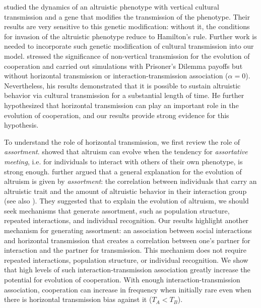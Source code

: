 \documentclass[12pt]{extarticle}
\begin{document}
\citet{feldman1985gene} studied the dynamics of an altruistic phenotype with vertical cultural transmission and a gene that modifies the transmission of the phenotype. Their results are very sensitive to this genetic modification: without it, the conditions for invasion of the altruistic phenotype reduce to Hamilton's rule.
Further work is needed to incorporate such genetic modification of cultural transmission into our model. %
\citet{woodcock2006significance} stressed the significance of non-vertical transmission for the evolution of cooperation and
carried out simulations with Prisoner's Dilemma payoffs but without horizontal transmission or interaction-transmission association ($\alpha=0$).
Nevertheless, his results demonstrated that it is possible to sustain altruistic behavior via cultural transmission for a substantial length of time.
He further hypothesized that horizontal transmission can play an important role in the evolution of cooperation, and our results provide strong evidence for this hypothesis. 

To understand the role of horizontal transmission, we first review the role of \emph{assortment}.
\citet{Eshel1982} showed that altruism can evolve when the tendency for \emph{assortative meeting}, i.e. for individuals to interact with others of their own phenotype, is strong enough.
\citet{Fletcher2009assortment}  further argued that a general explanation for the evolution of altruism is given by \emph{assortment}: the correlation between individuals that carry an altruistic trait and the amount of altruistic behavior in their interaction group (see also \citet{Bijma2010assortment}).
They suggested that to explain the evolution of altruism, we should seek mechanisms that generate  assortment, such as population structure, repeated interactions, and individual recognition.
Our results highlight another mechanism for generating assortment: an association between social interactions and horizontal transmission that creates a correlation between one's partner for interaction and the partner for transmission.
This mechanism does not require repeated interactions, population structure, or individual recognition.
We show that high levels of such interaction-transmission association greatly increase the potential for evolution of cooperation.
With enough interaction-transmission association, cooperation can increase in frequency when initially rare even when there is horizontal transmission bias against it ($T_A<T_B$).
\end{document}
